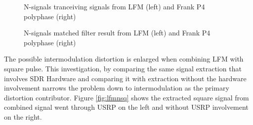 \documentclass[letterpaper, 12 pt, conference]{report}
\numberwithin{figure}{section}
\begin{document}
\begin{figure}[h]
\centering{}
\caption{N-signals tranceiving signals from LFM (left) and Frank P4 polyphase (right)}
\label{fig:lfmnp4}
\end{figure}
\begin{figure}[h]
\noindent{}
\noindent{}
\caption{N-signals matched filter result from LFM (left) and Frank P4 polyphase (right)}
\label{fig:lfmnp4mf}
\end{figure}
\FloatBarrier
The possible intermodulation distortion is enlarged when combining LFM with square pulse. This investigation, by comparing the same signal extraction that involves SDR Hardware and comparing it with extraction without the hardware involvement narrows the problem down to intermodulation as the primary distortion contributor. Figure \ref{fig:lfmnsq} shows the extracted square signal from combined signal went through USRP on the left and without USRP involvement on the right. 
\end{document}
